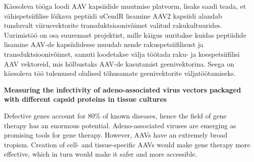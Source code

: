 \documentclass{trkut}%
\begin{document}

Käesoleva tööga loodi AAV kapsiidide muutmise platvorm, lisaks saadi teada, et vähispetsiifilise lõikava peptiidi uCendR lisamine AAV2 kapsiidi alandab tunduvalt viirusvektorite transduktsioonivõimet valitud rakukultuurides. Uurimistöö on osa suuremast projektist, mille käigus uuritakse kuidas peptiidide lisamine AAV-de kapsiididesse muudab nende rakuspetsiifilisust ja transduktsioonivõimet, samuti loodetakse välja töötada raku- ja koespetsiifilisi AAV vektoreid, mis hõlbustaks AAV-de kasutamist geenivektorina. Seega on käesoleva töö tulemused olulised tõhusamate geenivektorite väljatöötamiseks.



\textbf{Measuring the infectivity of adeno-associated virus vectors packaged with different capsid proteins in tissue cultures}

Defective genes account for 80\% of known diseases, hence the field of gene therapy has an enormous potential. Adeno-associated viruses are emerging as promising tools for gene therapy. However, AAVs have an extremely broad tropism. Creation of cell- and tissue-specific AAVs would make gene therapy more effective, which in turn would make it safer and more accessible.

\end{document}
